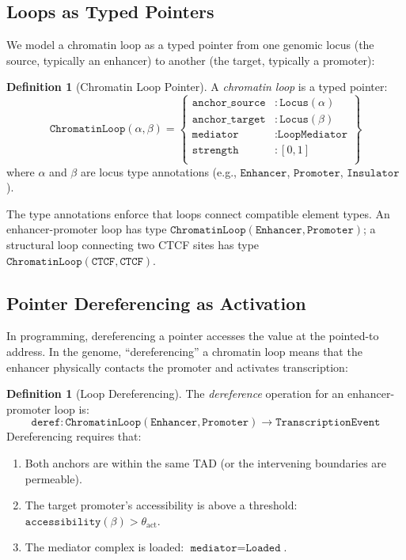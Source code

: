 \documentclass[12pt,a4paper]{article}
\theoremstyle{plain}
\theoremstyle{definition}
\newtheorem{definition}[theorem]{Definition}
\begin{document}
\subsection{Loops as Typed Pointers}

We model a chromatin loop as a typed pointer from one genomic locus (the source, typically an enhancer) to another (the target, typically a promoter):

\begin{definition}[Chromatin Loop Pointer]\label{def:loop-pointer}
A \emph{chromatin loop} is a typed pointer:
\[
  \texttt{ChromatinLoop}(\alpha, \beta) = \left\{
    \begin{array}{ll}
      \texttt{anchor\_source} &: \texttt{Locus}(\alpha) \\
      \texttt{anchor\_target} &: \texttt{Locus}(\beta) \\
      \texttt{mediator} &: \texttt{LoopMediator} \\
      \texttt{strength} &: [0, 1] \\
    \end{array}
  \right\}
\]
where $\alpha$ and $\beta$ are locus type annotations (e.g., $\texttt{Enhancer}$, $\texttt{Promoter}$, $\texttt{Insulator}$).
\end{definition}

The type annotations enforce that loops connect compatible element types. An enhancer-promoter loop has type $\texttt{ChromatinLoop}(\texttt{Enhancer}, \texttt{Promoter})$; a structural loop connecting two CTCF sites has type $\texttt{ChromatinLoop}(\texttt{CTCF}, \texttt{CTCF})$.

\subsection{Pointer Dereferencing as Activation}

In programming, dereferencing a pointer accesses the value at the pointed-to address. In the genome, ``dereferencing'' a chromatin loop means that the enhancer physically contacts the promoter and activates transcription:

\begin{definition}[Loop Dereferencing]\label{def:deref}
The \emph{dereference} operation for an enhancer-promoter loop is:
\[
  \texttt{deref} : \texttt{ChromatinLoop}(\texttt{Enhancer}, \texttt{Promoter}) \to \texttt{TranscriptionEvent}
\]
Dereferencing requires that:
\begin{enumerate}[label=(\roman*)]
  \item Both anchors are within the same TAD (or the intervening boundaries are permeable).
  \item The target promoter's accessibility is above a threshold: $\texttt{accessibility}(\beta) > \theta_{\text{act}}$.
  \item The mediator complex is loaded: $\texttt{mediator} = \texttt{Loaded}$.
\end{enumerate}
\end{definition}
\end{document}
